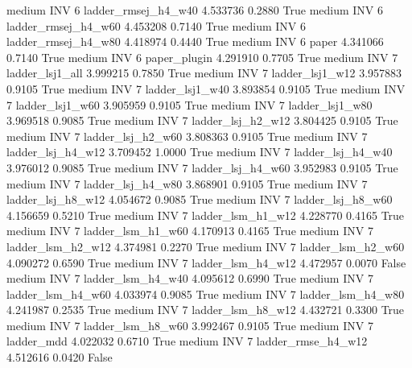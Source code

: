     medium      INV                 6 ladder_rmsej_h4_w40   4.533736      0.2880    True
    medium      INV                 6 ladder_rmsej_h4_w60   4.453208      0.7140    True
    medium      INV                 6 ladder_rmsej_h4_w80   4.418974      0.4440    True
    medium      INV                 6               paper   4.341066      0.7140    True
    medium      INV                 6        paper_plugin   4.291910      0.7705    True
    medium      INV                 7     ladder_lsj1_all   3.999215      0.7850    True
    medium      INV                 7     ladder_lsj1_w12   3.957883      0.9105    True
    medium      INV                 7     ladder_lsj1_w40   3.893854      0.9105    True
    medium      INV                 7     ladder_lsj1_w60   3.905959      0.9105    True
    medium      INV                 7     ladder_lsj1_w80   3.969518      0.9085    True
    medium      INV                 7   ladder_lsj_h2_w12   3.804425      0.9105    True
    medium      INV                 7   ladder_lsj_h2_w60   3.808363      0.9105    True
    medium      INV                 7   ladder_lsj_h4_w12   3.709452      1.0000    True
    medium      INV                 7   ladder_lsj_h4_w40   3.976012      0.9085    True
    medium      INV                 7   ladder_lsj_h4_w60   3.952983      0.9105    True
    medium      INV                 7   ladder_lsj_h4_w80   3.868901      0.9105    True
    medium      INV                 7   ladder_lsj_h8_w12   4.054672      0.9085    True
    medium      INV                 7   ladder_lsj_h8_w60   4.156659      0.5210    True
    medium      INV                 7   ladder_lsm_h1_w12   4.228770      0.4165    True
    medium      INV                 7   ladder_lsm_h1_w60   4.170913      0.4165    True
    medium      INV                 7   ladder_lsm_h2_w12   4.374981      0.2270    True
    medium      INV                 7   ladder_lsm_h2_w60   4.090272      0.6590    True
    medium      INV                 7   ladder_lsm_h4_w12   4.472957      0.0070   False
    medium      INV                 7   ladder_lsm_h4_w40   4.095612      0.6990    True
    medium      INV                 7   ladder_lsm_h4_w60   4.033974      0.9085    True
    medium      INV                 7   ladder_lsm_h4_w80   4.241987      0.2535    True
    medium      INV                 7   ladder_lsm_h8_w12   4.432721      0.3300    True
    medium      INV                 7   ladder_lsm_h8_w60   3.992467      0.9105    True
    medium      INV                 7          ladder_mdd   4.022032      0.6710    True
    medium      INV                 7  ladder_rmse_h4_w12   4.512616      0.0420   False

